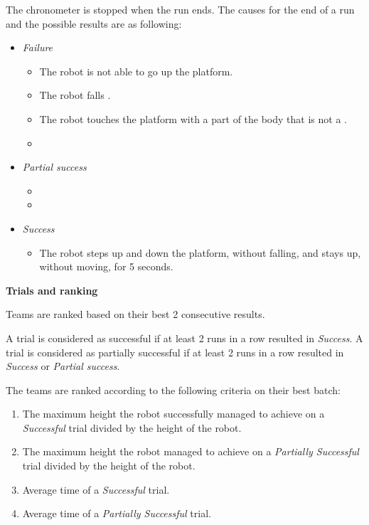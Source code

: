The chronometer is stopped when the run ends. The causes for the end of a run and
the possible results are as following:
\begin{itemize}
\item \textit{Failure}
  \begin{itemize}
    \item The robot is not able to go up the platform.
    \item The robot falls .    \item The robot touches the platform with a part of the body that is not a .
    \item {}
     \end{itemize}
\item \textit{Partial success}
  \begin{itemize}
    \item {}
     \item {}
  \end{itemize}
\item \textit{Success}
  \begin{itemize}
    \item The robot steps up and down the platform, without falling, and stays up, without moving, for 5 seconds. 
  \end{itemize}
\end{itemize}

{\bfseries Trials and ranking}

\smallskip

Teams are ranked based on their best 2 consecutive results.

A trial is considered as successful if at least 2 runs in a row resulted in \textit{Success}. A trial is considered as
partially successful if at least 2 runs in a row resulted in \textit{Success} or \textit{Partial success}.

The teams are ranked according to the following criteria on their best batch:
\begin{enumerate}
\item The maximum height the robot successfully managed to achieve on a \textit{Successful} trial divided by the height of the robot.
\item The maximum height the robot managed to achieve on a \textit{Partially Successful} trial divided by the height of the robot.
\item Average time of a \textit{Successful} trial.
\item Average time of a \textit{Partially Successful} trial.
\end{enumerate}
